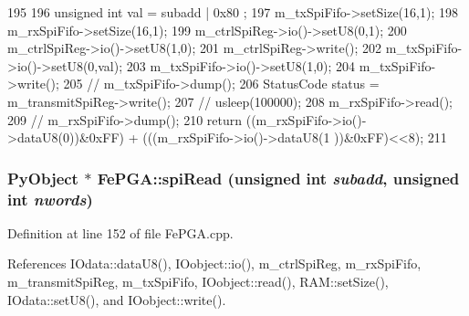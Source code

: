 \begin{DoxyCode}
195                                                {
196   unsigned int val = subadd | 0x80 ; 
197   m_txSpiFifo->setSize(16,1);
198   m_rxSpiFifo->setSize(16,1);
199   m_ctrlSpiReg->io()->setU8(0,1);
200   m_ctrlSpiReg->io()->setU8(1,0);
201   m_ctrlSpiReg->write();
202   m_txSpiFifo->io()->setU8(0,val);
203   m_txSpiFifo->io()->setU8(1,0);
204   m_txSpiFifo->write();
205   //  m_txSpiFifo->dump();
206   StatusCode status = m_transmitSpiReg->write();  
207   //  usleep(100000);
208   m_rxSpiFifo->read();
209   //  m_rxSpiFifo->dump();
210   return   ((m_rxSpiFifo->io()->dataU8(0))&0xFF) + (((m_rxSpiFifo->io()->dataU8(1
      ))&0xFF)<<8);
211 } 
\end{DoxyCode}
\hypertarget{classFePGA_a41fb676237f8906ec5a0c1b9084ad33e}{
\subsubsection[{spiRead}]{\setlength{\rightskip}{0pt plus 5cm}PyObject $\ast$ FePGA::spiRead (unsigned int {\em subadd}, \/  unsigned int {\em nwords})}}
\label{classFePGA_a41fb676237f8906ec5a0c1b9084ad33e}


Definition at line 152 of file FePGA.cpp.

References IOdata::dataU8(), IOobject::io(), m\_\-ctrlSpiReg, m\_\-rxSpiFifo, m\_\-transmitSpiReg, m\_\-txSpiFifo, IOobject::read(), RAM::setSize(), IOdata::setU8(), and IOobject::write().


